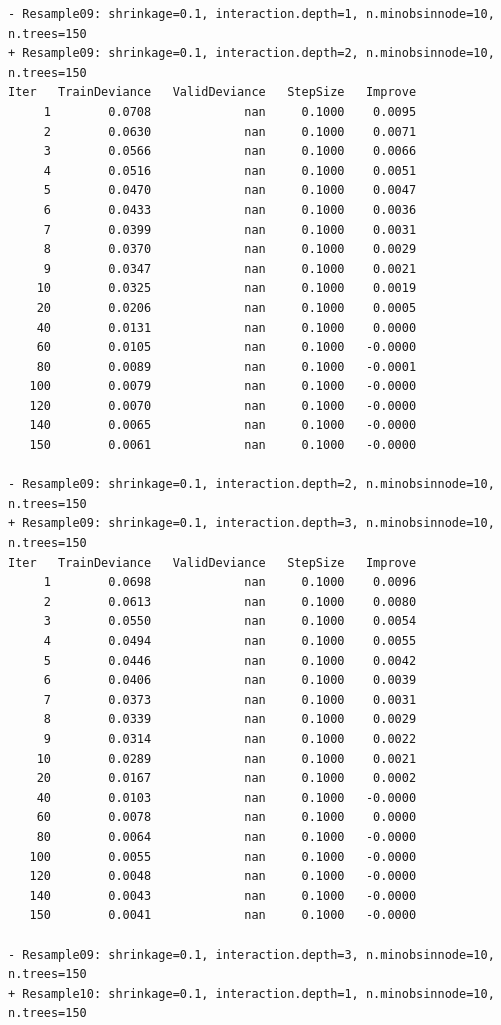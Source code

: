 \documentclass[
  letterpaper,
  DIV=11,
  numbers=noendperiod]{scrartcl}
\begin{document}
\begin{verbatim}
- Resample09: shrinkage=0.1, interaction.depth=1, n.minobsinnode=10, n.trees=150 
+ Resample09: shrinkage=0.1, interaction.depth=2, n.minobsinnode=10, n.trees=150 
Iter   TrainDeviance   ValidDeviance   StepSize   Improve
     1        0.0708             nan     0.1000    0.0095
     2        0.0630             nan     0.1000    0.0071
     3        0.0566             nan     0.1000    0.0066
     4        0.0516             nan     0.1000    0.0051
     5        0.0470             nan     0.1000    0.0047
     6        0.0433             nan     0.1000    0.0036
     7        0.0399             nan     0.1000    0.0031
     8        0.0370             nan     0.1000    0.0029
     9        0.0347             nan     0.1000    0.0021
    10        0.0325             nan     0.1000    0.0019
    20        0.0206             nan     0.1000    0.0005
    40        0.0131             nan     0.1000    0.0000
    60        0.0105             nan     0.1000   -0.0000
    80        0.0089             nan     0.1000   -0.0001
   100        0.0079             nan     0.1000   -0.0000
   120        0.0070             nan     0.1000   -0.0000
   140        0.0065             nan     0.1000   -0.0000
   150        0.0061             nan     0.1000   -0.0000

- Resample09: shrinkage=0.1, interaction.depth=2, n.minobsinnode=10, n.trees=150 
+ Resample09: shrinkage=0.1, interaction.depth=3, n.minobsinnode=10, n.trees=150 
Iter   TrainDeviance   ValidDeviance   StepSize   Improve
     1        0.0698             nan     0.1000    0.0096
     2        0.0613             nan     0.1000    0.0080
     3        0.0550             nan     0.1000    0.0054
     4        0.0494             nan     0.1000    0.0055
     5        0.0446             nan     0.1000    0.0042
     6        0.0406             nan     0.1000    0.0039
     7        0.0373             nan     0.1000    0.0031
     8        0.0339             nan     0.1000    0.0029
     9        0.0314             nan     0.1000    0.0022
    10        0.0289             nan     0.1000    0.0021
    20        0.0167             nan     0.1000    0.0002
    40        0.0103             nan     0.1000   -0.0000
    60        0.0078             nan     0.1000    0.0000
    80        0.0064             nan     0.1000   -0.0000
   100        0.0055             nan     0.1000   -0.0000
   120        0.0048             nan     0.1000   -0.0000
   140        0.0043             nan     0.1000   -0.0000
   150        0.0041             nan     0.1000   -0.0000

- Resample09: shrinkage=0.1, interaction.depth=3, n.minobsinnode=10, n.trees=150 
+ Resample10: shrinkage=0.1, interaction.depth=1, n.minobsinnode=10, n.trees=150 
\end{verbatim}
\end{document}
